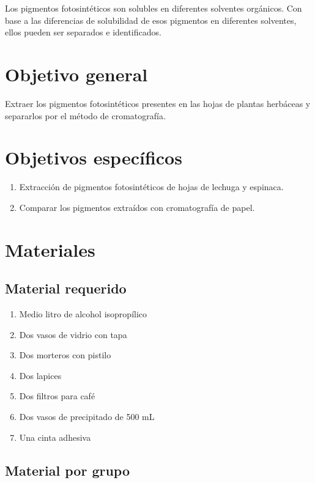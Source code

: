Los pigmentos fotosint\'eticos son solubles en diferentes solventes org\'anicos. Con base a las diferencias de solubilidad de esos pigmentos en diferentes solventes, ellos pueden ser separados e identificados. 

\section{Objetivo general}

Extraer los pigmentos fotosint\'eticos presentes en las hojas de plantas herbáceas y separarlos por el m\'etodo de cromatograf\'ia.

\section{Objetivos espec\'ificos}

\begin{enumerate}
	\item Extracci\'on de pigmentos fotosint\'eticos de hojas de lechuga y espinaca.
	\item Comparar los pigmentos extra\'idos con cromatograf\'ia de papel.
\end{enumerate}

\section{Materiales}

\subsection{Material requerido}

\begin{enumerate}
	\item Medio litro de alcohol isopropílico 
	\item Dos vasos de vidrio con tapa
	\item Dos morteros con pistilo
	\item Dos lapices
	\item Dos filtros para caf\'e
	\item Dos vasos de precipitado de 500 mL
	\item Una cinta adhesiva
\end{enumerate}

\subsection{Material por grupo}

